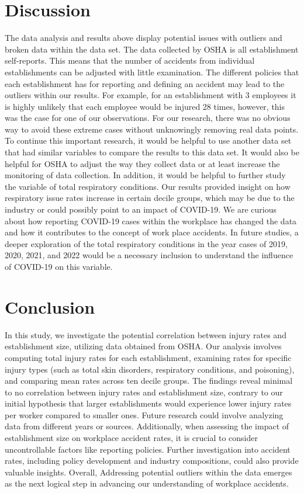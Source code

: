 \documentclass[12pt]{article}
\begin{document}
\section{Discussion}
\label{sec:discussion}

 The data analysis and results above display potential issues with outliers and broken data within the data set. The data collected by OSHA is all establishment self-reports. This means that the number of accidents from individual establishments can be adjusted with little examination. The different policies that each establishment has for reporting and defining an accident may lead to the outliers within our results. For example, for an establishment with 3 employees it is highly unlikely that each employee would be injured 28 times, however, this was the case for one of our observations. For our research, there was no obvious way to avoid these extreme cases without unknowingly removing real data points. To continue this important research, it would be helpful to use another data set that had similar variables to compare the results to this data set. It would also be helpful for OSHA to adjust the way they collect data or at least increase the monitoring of data collection. In addition, it would be helpful to further study the variable of total respiratory conditions. Our results provided insight on how respiratory issue rates increase in certain decile groups, which may be due to the industry or could possibly point to an impact of COVID-19. We are curious about how reporting COVID-19 cases within the workplace has changed the data and how it contributes to the concept of work place accidents. In future studies, a deeper exploration of the total respiratory conditions in the year cases of 2019, 2020, 2021, and 2022 would be a necessary inclusion to understand the influence of COVID-19 on this variable. 


\section{Conclusion}
\label{sec:conclusion}

In this study, we investigate the potential correlation between injury rates and establishment size, utilizing data obtained from OSHA. Our analysis involves computing total injury rates for each establishment, examining rates for specific injury types (such as total skin disorders, respiratory conditions, and poisoning), and comparing mean rates across ten decile groups. The findings reveal minimal to no correlation between injury rates and establishment size, contrary to our initial hypothesis that larger establishments would experience lower injury rates per worker compared to smaller ones.  Future research could involve analyzing data from different years or sources. Additionally, when assessing the impact of establishment size on workplace accident rates, it is crucial to consider uncontrollable factors like reporting policies. Further investigation into  accident rates, including policy development and industry compositions, could also provide valuable insights. Overall, Addressing potential outliers within the data emerges as the next logical step in advancing our understanding of workplace accidents.
\end{document}
